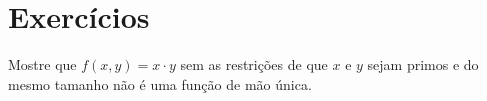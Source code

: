 \section{Exercícios}

\begin{exercicio}
  Mostre que $f(x,y) = x \cdot y$ sem as restrições de que $x$ e $y$ sejam primos e do mesmo tamanho não é uma função de mão única.
\end{exercicio}


